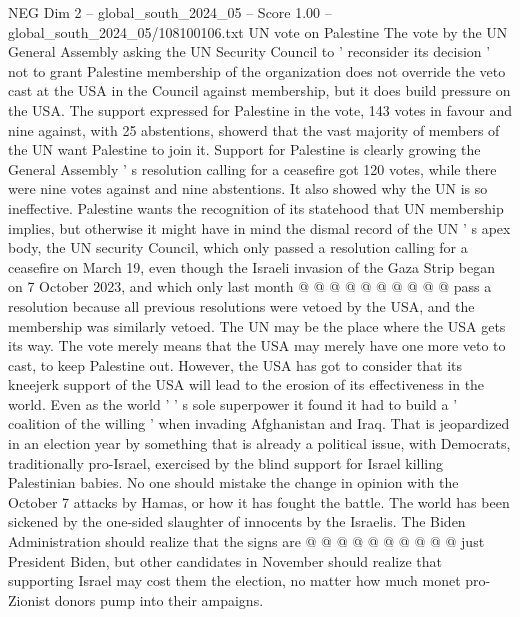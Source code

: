 \begin{textsample}{NEG Dim 2 – global\_south\_2024\_05 – Score 1.00 – global\_south\_2024\_05/108100106.txt}  \label{ex:f2_neg_222}
UN vote on Palestine The vote by the UN General Assembly asking the UN Security Council to ' reconsider its decision ' not to grant Palestine membership of the organization does not override the veto cast at the USA in the Council against membership, but it does build pressure on the USA.
The support expressed for Palestine in the vote, 143 votes in favour and nine against, with 25 abstentions, showerd that the vast majority of members of the UN want Palestine to join it.
Support for Palestine is clearly growing the General Assembly ' s resolution calling for a ceasefire got 120 votes, while there were nine votes against and nine abstentions.
It also showed why the UN is so ineffective.
Palestine wants the recognition of its statehood that UN membership implies, but otherwise it might have in mind the dismal record of the UN ' s apex body, the UN security Council, which only passed a resolution calling for a ceasefire on March 19, even though the Israeli invasion of the Gaza Strip began on 7 October 2023, and which only last month @ @ @ @ @ @ @ @ @ @ pass a resolution because all previous resolutions were vetoed by the USA, and the membership was similarly vetoed.
The UN may be the place where the USA gets its way.
The vote merely means that the USA may merely have one more veto to cast, to keep Palestine out.
However, the USA has got to consider that its kneejerk support of the USA will lead to the erosion of its effectiveness in the world.
Even as the world ' ' s sole superpower it found it had to build a ' coalition of the willing ' when invading Afghanistan and Iraq.
That is jeopardized in an election year by something that is already a political issue, with Democrats, traditionally pro-Israel, exercised by the blind support for Israel killing Palestinian babies.
No one should mistake the change in opinion with the October 7 attacks by Hamas, or how it has fought the battle.
The world has been sickened by the one-sided slaughter of innocents by the Israelis.
The Biden Administration should realize that the signs are @ @ @ @ @ @ @ @ @ @ just President Biden, but other candidates in November should realize that supporting Israel may cost them the election, no matter how much monet pro-Zionist donors pump into their ampaigns.

\end{textsample}
